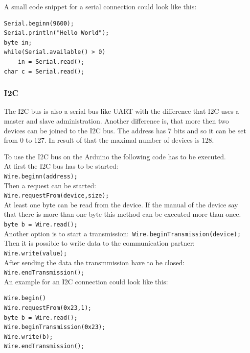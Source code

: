 A small code snippet for a serial connection could look like this:\\
\begin{lstlisting}
Serial.beginn(9600);
Serial.println("Hello World");
byte in;
while(Serial.available() > 0)
	in = Serial.read();
char c = Serial.read();
\end{lstlisting}


\subsubsection{I2C}\label{sec:i2c}
The I2C bus is also a serial bus like UART with the difference that I2C uses a master and slave administration.
Another difference is, that more then two devices can be joined to the I2C bus.
The address has 7 bits and so it can be set from 0 to 127.
In result of that the maximal number of devices is 128.

To use the I2C bus on the Arduino the following code has to be executed.\\
At first the I2C bus has to be started: \\
\lstinline|Wire.beginn(address);| \\
Then a request can be started: \\
\lstinline|Wire.requestFrom(device,size);| \\
At least one byte can be read from the device.
If the manual of the device say that there is more than one byte this method can be executed more than once. \\
\lstinline|byte b = Wire.read();| \\
Another option is to start a transmission:\
\lstinline|Wire.beginTransmission(device);| \\
Then it is possible to write data to the communication partner:\\
\lstinline|Wire.write(value);|\\
After sending the data the transmmission have to be closed:\\
\lstinline|Wire.endTransmission();|\\
An example for an I2C connection could look like this:\\
\begin{lstlisting}
Wire.begin()
Wire.requestFrom(0x23,1);
byte b = Wire.read();
Wire.beginTransmission(0x23);
Wire.write(b);
Wire.endTransmission();
\end{lstlisting}
